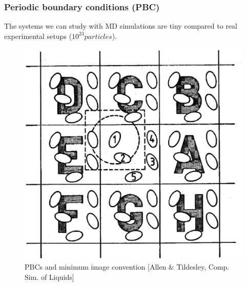 \documentclass{beamer}
\begin{document}
\begin{frame}\frametitle{Periodic boundary conditions (PBC)}
The systems we can study with MD simulations are tiny compared to real experimental setups ($10^{23} particles$).

\begin{figure}
\includegraphics[scale=0.2]{pbc.eps}
\caption{{\scriptsize PBCs and minimum image convention [Allen \& Tildesley, Comp. Sim. of Liquids]}}
\end{figure}

\end{frame}
\end{document}
